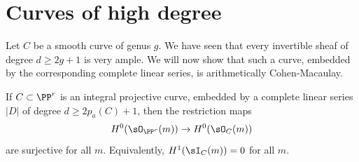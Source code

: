 \section{Curves of high degree}\label{high degree ACM}
Let $C$ be a smooth curve of  genus $g$. We have seen that every invertible sheaf of degree $d \geq 2g+1$ is very ample. We will now show that
such a curve,  embedded by the corresponding complete linear series, is arithmetically Cohen-Macaulay.

\begin{theorem}\label{high degree ACM}
If $C\subset \PP^r$ is an integral projective curve, embedded by a complete linear series $|D|$ of degree $d\geq 2p_a(C)+1$, then
the restriction maps 
$$
H^0(\sO_{\PP^{r}}(m)) \to H^0(\sO_C(m))
$$
 are surjective for all $m$. Equivalently, $H^1(\sI_C(m)) = 0$ for all $m$.
\end{theorem}


